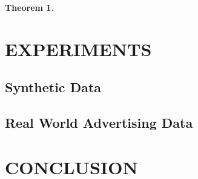 \documentclass[twoside]{article}
\newtheorem{theorem}{Theorem}
\newtheorem{lemma}{Lemma}
\newcommand{\Wave}{{\mathcal{\hat W}^{ave}}}
\newcommand{\w}{\theta}
\newcommand{\wmle}{\hat\w^{mle}}
\newcommand{\wstar}{{\w^{*}}}
\newcommand{\ltwo}[1]{{\left\lVert {#1} \right\rVert}_2}
\newcommand{\proj}[1]{\pi_{{#1}}}
\newcommand{\ignore}[1]{}
\begin{document}
{\begin{theorem}

\end{theorem}

\ignore{
\subsection{Overall growth}

In this section we assume the following regularity conditions.

\begin{theorem}
Assume conditions (1-5) above hold.
Then in the limit as $n$ approaches $\infty$:
\begin{enumerate}
\item
If $f$ is locally $\sigma$-strongly convex around $\wstar$
\begin{equation}
\Pr{a}
\end{equation}
\item
If $f$ is locally $\ell$-Lipschitz around $\wstar$
(i.e. ),
then
\begin{equation}
\end{equation}
\end{enumerate}
\end{theorem}

\begin{lemma}
\label{lem:normaff}
Let $W : \mathbb{R}^{d\times m}$ be a random matrix where each entry is distributed as a standard Gaussian.
Let $\Wave$ be the affine hull of the columns of $W$;
that is,
\begin{equation}
\Wave = \left\{\sum_{i=1}^m c_i\wmle_i : c\in\mathbb{R}, \sum_{i=1}^m c_i = 1 \right\}
\end{equation}
Then for all $t$,
\begin{equation}
\Pr\left[\ltwo{\proj{W}0}^2 > O(t(1-m/d))\right] \le 1 - \exp(-t)
\end{equation}
\end{lemma}
}

\section{EXPERIMENTS}

\subsection{Synthetic Data}

\subsection{Real World Advertising Data}

\section{CONCLUSION}
}
\end{document}
